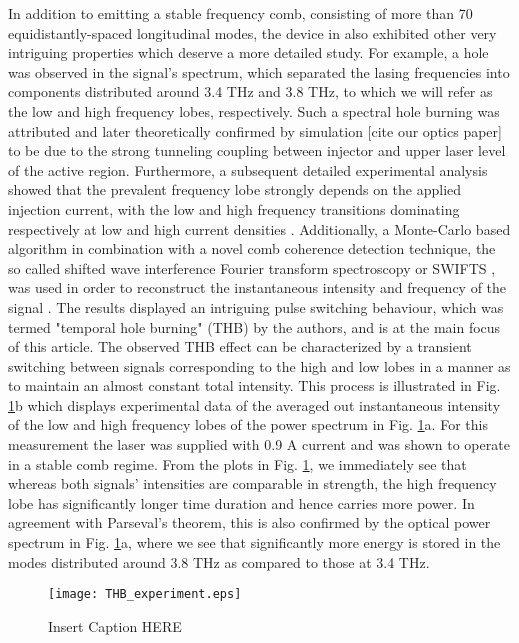 \documentclass[]{spie}  %
\begin{document}
In addition to emitting a stable frequency comb, consisting of more than 70
equidistantly-spaced longitudinal modes, the device in
\cite{burghoff2014terahertz} also exhibited other very intriguing properties
which deserve a more detailed study. For example, a hole was observed in the
signal's spectrum, which separated the lasing frequencies into components
distributed around 3.4 THz and 3.8 THz, to which we will refer  as the low and
high frequency lobes, respectively. Such a spectral hole burning was attributed
and later theoretically confirmed by simulation [cite our optics paper] to be
due to the strong tunneling coupling between injector and upper laser level of
the active region. Furthermore, a subsequent detailed experimental analysis
\cite{burghoff2015evaluating} showed that the prevalent frequency lobe strongly
depends on the applied injection current, with the low and high frequency
transitions dominating respectively at low and high current densities
\cite{burghoff2015evaluating}. Additionally, a Monte-Carlo based algorithm in
combination with a novel comb coherence detection technique, the so called
shifted wave interference Fourier transform spectroscopy or SWIFTS
\cite{burghoff2014broadband}, was used in order to reconstruct the
instantaneous intensity and frequency of the signal
\cite{burghoff2015evaluating}. The results displayed an intriguing pulse
switching behaviour, which was termed "temporal hole burning" (THB) by the
authors, and is at the main focus of this article.  The observed THB effect can
be characterized by a transient switching between signals corresponding to the
high and low lobes in a manner as to maintain an almost constant total
intensity. This process is illustrated in Fig. \ref{fig:img01}b which displays
experimental data of the averaged out instantaneous intensity of the low and
high frequency lobes of the power spectrum in Fig. \ref{fig:img01}a. For this
measurement the laser was supplied with 0.9 A current and was shown to operate
in a stable comb regime. From the plots in Fig. \ref{fig:img01}, we immediately
see that whereas both signals' intensities are comparable in strength, the high
frequency lobe has significantly longer time duration and hence carries more
power. In agreement with Parseval's theorem, this is also confirmed by the
optical power spectrum in Fig. \ref{fig:img01}a, where we see that
significantly more energy is stored in the modes distributed around 3.8 THz as
compared to those at 3.4 THz.  \begin{figure}[h!] \begin{center}
 		\texttt{[image: THB\_experiment.eps]} \caption{ Insert Caption HERE}
 		\label{fig:img01} \end{center}	\end{figure}
\end{document}
